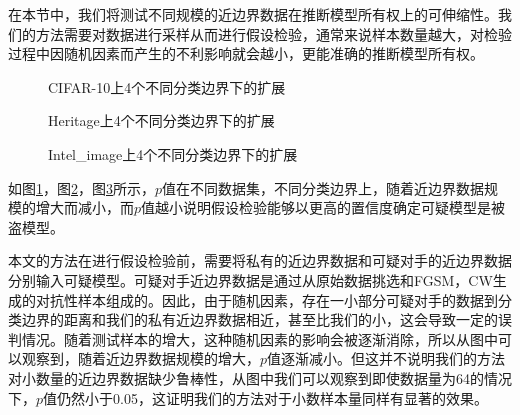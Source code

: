 在本节中，我们将测试不同规模的近边界数据在推断模型所有权上的可伸缩性。我们的方法需要对数据进行采样从而进行假设检验，通常来说样本数量越大，对检验过程中因随机因素而产生的不利影响就会越小，更能准确的推断模型所有权。

\begin{figure}[!htb]
	\centering
	\caption{CIFAR-10上4个不同分类边界下的扩展}
	\label{CIFAR-10上推断模型所有权的扩展性}
\end{figure}

\begin{figure}[!htb]
	\centering
	\caption{Heritage上4个不同分类边界下的扩展}
	\label{Heritage上推断模型所有权的扩展性}
\end{figure}

\begin{figure}[!htb]
	\centering
	\caption{Intel\_image上4个不同分类边界下的扩展}
	\label{Intel-image上推断模型所有权的扩展性}
\end{figure}

如图\ref{CIFAR-10上推断模型所有权的扩展性}，图\ref{Heritage上推断模型所有权的扩展性}，图\ref{Intel-image上推断模型所有权的扩展性}所示，$p$值在不同数据集，不同分类边界上，随着近边界数据规模的增大而减小，而$p$值越小说明假设检验能够以更高的置信度确定可疑模型是被盗模型。

本文的方法在进行假设检验前，需要将私有的近边界数据和可疑对手的近边界数据分别输入可疑模型。可疑对手近边界数据是通过从原始数据挑选和FGSM，CW生成的对抗性样本组成的。因此，由于随机因素，存在一小部分可疑对手的数据到分类边界的距离和我们的私有近边界数据相近，甚至比我们的小，这会导致一定的误判情况。随着测试样本的增大，这种随机因素的影响会被逐渐消除，所以从图中可以观察到，随着近边界数据规模的增大，$p$值逐渐减小。但这并不说明我们的方法对小数量的近边界数据缺少鲁棒性，从图中我们可以观察到即使数据量为64的情况下，$p$值仍然小于0.05，这证明我们的方法对于小数样本量同样有显著的效果。

